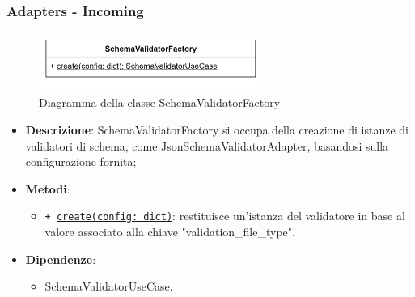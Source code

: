 \subsubsection{Adapters - Incoming}

 \label{SchemaValidatorFactory}
\begin{figure}[H]
    \centering
    \includegraphics[width=0.65\textwidth]{assets/Backend/schema_validator_factory.png}
    \caption{Diagramma della classe SchemaValidatorFactory}
  \end{figure}
\begin{itemize}
    \item \textbf{Descrizione}: SchemaValidatorFactory si occupa della creazione di istanze di validatori di schema, come JsonSchemaValidatorAdapter, basandosi sulla configurazione fornita;
    \item \textbf{Metodi}:
    \begin{itemize}
        \item \texttt{+ \underline{create(config: dict)}}: restituisce un'istanza del validatore in base al valore associato alla chiave "validation\_file\_type".
    \end{itemize}
    \item \textbf{Dipendenze}:
    \begin{itemize}
        \item SchemaValidatorUseCase.
    \end{itemize}
\end{itemize}  

